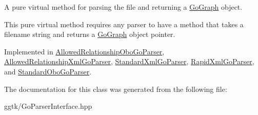 A pure virtual method for parsing the file and returning a \hyperlink{classGoGraph}{Go\+Graph} object. 

This pure virtual method requires any parser to have a method that takes a filename string and returns a \hyperlink{classGoGraph}{Go\+Graph} object pointer. 

Implemented in \hyperlink{classAllowedRelationshipOboGoParser_a6eb0ab84216c386a2595aa47233448ad}{Allowed\+Relationship\+Obo\+Go\+Parser}, \hyperlink{classAllowedRelationshipXmlGoParser_ad6e002e7cd0994866b62dba0896d3d24}{Allowed\+Relationship\+Xml\+Go\+Parser}, \hyperlink{classStandardXmlGoParser_ae56413ab11d1fa8f3870f5bcc262d3f8}{Standard\+Xml\+Go\+Parser}, \hyperlink{classRapidXmlGoParser_a7c42085d86c58983601fdada4aaacd9d}{Rapid\+Xml\+Go\+Parser}, and \hyperlink{classStandardOboGoParser_a4eb0d67f0c78456d1e0a9a3f55294424}{Standard\+Obo\+Go\+Parser}.



The documentation for this class was generated from the following file\+:\begin{DoxyCompactItemize}
\item 
ggtk/Go\+Parser\+Interface.\+hpp\end{DoxyCompactItemize}
